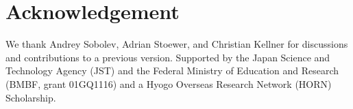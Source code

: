 \documentclass{frontiersSCNS} %
\begin{document}

\section*{Acknowledgement}
We thank Andrey Sobolev, Adrian Stoewer, and Christian Kellner for discussions
and contributions to a previous version.
Supported by the Japan Science and Technology Agency (JST) and the Federal
Ministry of Education and Research (BMBF, grant 01GQ1116) and a Hyogo Overseas
Research Network (HORN) Scholarship.









\end{document}
